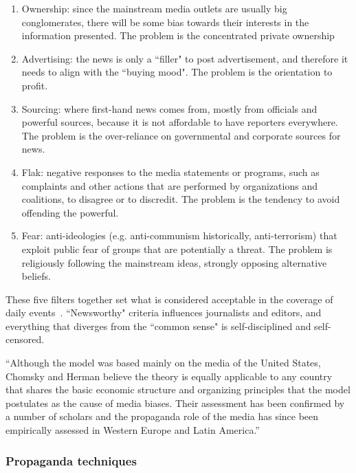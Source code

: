 \begin{enumerate}
    \item Ownership: since the mainstream media outlets are usually big conglomerates, there will be some bias towards their interests in the information presented. The problem is the concentrated private ownership
    \item Advertising: the news is only a ``filler" to post advertisement, and therefore it needs to align with the ``buying mood". The problem is the orientation to profit.
    \item Sourcing: where first-hand news comes from, mostly from officials and powerful sources, because it is not affordable to have reporters everywhere. The problem is the over-reliance on governmental and corporate sources for news.
    \item Flak: negative responses to the media statements or programs, such as complaints and other actions that are performed by organizations and coalitions, to disagree or to discredit. The problem is the tendency to avoid offending the powerful.
    \item Fear: anti-ideologies (e.g. anti-communism historically, anti-terrorism) that exploit public fear of groups that are potentially a threat. The problem is religiously following the mainstream ideas, strongly opposing alternative beliefs.
\end{enumerate}

These five filters together set what is considered acceptable in the coverage of daily events~\citep{phillips2007left}. ``Newsworthy" criteria influences journalists and editors, and everything that diverges from the ``common sense" is self-disciplined and self-censored.

“Although the model was based mainly on the media of the United States, Chomsky and Herman believe the theory is equally applicable to any country that shares the basic economic structure and organizing principles that the model postulates as the cause of media biases. Their assessment has been confirmed by a number of scholars and the propaganda role of the media has since been empirically assessed in Western Europe and Latin America.”~\cite{herman1996propaganda}


\subsubsection{Propaganda techniques}

